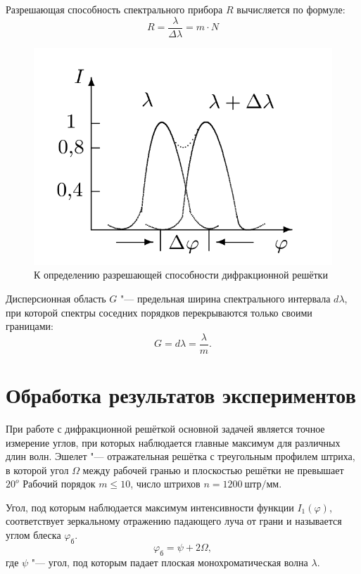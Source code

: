 \documentclass[10pt, a4paper]{article}
\begin{document}
 
 Разрешающая способность спектрального прибора $R$ вычисляется по формуле:
 \[
 R = \frac{\lambda}{\Delta \lambda} = m \cdot N
 \]
 \begin{figure}[H]
	\includegraphics[width = 1.0\linewidth]{k.png}
	\caption*{К определению разрешающей способности дифракционной решётки}
\end{figure}
Дисперсионная область $G$ "--- предельная ширина спектрального интервала $d \lambda$, при которой спектры соседних порядков перекрываются только своими границами:
\[
G = d \lambda = \frac{\lambda}{m}.
\]
\section*{Обработка результатов экспериментов}
При работе с дифракционной решёткой основной задачей является точное измерение углов, при которых наблюдается главные максимум для различных длин волн.
Эшелет "--- отражательная решётка с  треугольным профилем штриха, в которой угол $\Omega$ между рабочей гранью и плоскостью решётки не превышает $20^o$
Рабочий порядок $m \leq 10$, число штрихов $n = 1200\ штр/мм$.

Угол, под которым наблюдается максимум интенсивности функции $I_1 (\varphi)$, соответствует зеркальному отражению падающего луча от грани и называется углом блеска $\varphi_б$.
\[
	\varphi_б = \psi + 2 \Omega,
\]
где $\psi$ "--- угол, под которым падает плоская монохроматическая волна $\lambda$.
\end{document}

